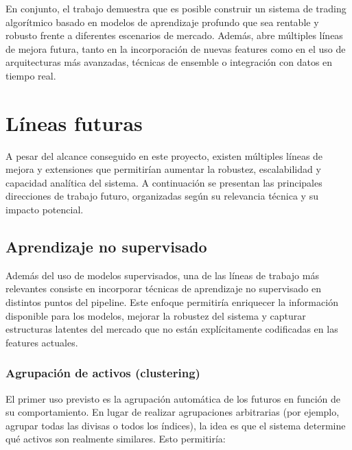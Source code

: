 En conjunto, el trabajo demuestra que es posible construir un sistema de trading algorítmico basado en modelos de aprendizaje profundo que sea
rentable y robusto frente a diferentes escenarios de mercado. Además, abre múltiples líneas de mejora futura, tanto en la incorporación de nuevas
features como en el uso de arquitecturas más avanzadas, técnicas de ensemble o integración con datos en tiempo real.

\section{Líneas futuras}

A pesar del alcance conseguido en este proyecto, existen múltiples líneas de mejora y extensiones que permitirían aumentar la robustez, escalabilidad
y capacidad analítica del sistema. A continuación se presentan las principales direcciones de trabajo futuro, organizadas según su relevancia técnica
y su impacto potencial.

\subsection{Aprendizaje no supervisado}


Además del uso de modelos supervisados, una de las líneas de trabajo más relevantes consiste en incorporar técnicas de aprendizaje no supervisado en
distintos puntos del pipeline. Este enfoque permitiría enriquecer la información disponible para los modelos, mejorar la robustez del sistema y
capturar estructuras latentes del mercado que no están explícitamente codificadas en las features actuales.

\subsubsection{Agrupación de activos (clustering)}

El primer uso previsto es la agrupación automática de los futuros en función de su comportamiento. En lugar de realizar agrupaciones arbitrarias (por
ejemplo, agrupar todas las divisas o todos los índices), la idea es que el sistema determine qué activos son realmente similares. Esto permitiría:


